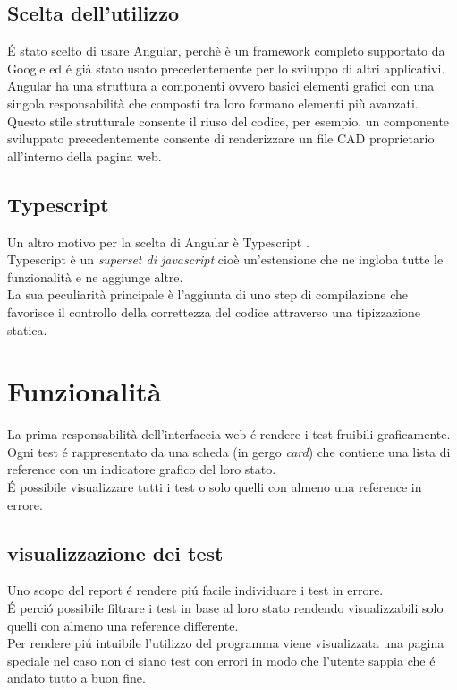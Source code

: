         \subsection{Scelta dell'utilizzo}
            \'E stato scelto di usare Angular, perchè è un framework completo supportato da Google
            ed \'e già stato usato precedentemente per lo sviluppo di altri applicativi.\\
            
            Angular ha una struttura a componenti ovvero basici elementi grafici con una singola responsabilità che composti tra loro formano elementi più avanzati.\\
            Questo stile strutturale consente il riuso del codice, per esempio, un componente sviluppato precedentemente consente
            di renderizzare un file CAD proprietario all'interno della pagina web.
        
        \subsection{Typescript}
            Un altro motivo per la scelta di Angular è Typescript \cite{Typescript}.\\
            Typescript è un \textit{superset di javascript} cioè un'estensione che ne ingloba tutte le funzionalità e ne aggiunge altre.\\
            La sua peculiarità principale è l'aggiunta di uno step di compilazione che favorisce il controllo della correttezza del codice attraverso una tipizzazione statica.
    \section{Funzionalità}
        La prima responsabilità dell'interfaccia web \'e rendere i test fruibili graficamente.\\
        Ogni test \'e rappresentato da una scheda (in gergo \textit{card}) che contiene una lista di reference con un indicatore grafico del loro stato.\\
        \'E possibile visualizzare tutti i test o solo quelli con almeno una reference in errore.\\
        \subsection{visualizzazione dei test}        
            Uno scopo del report \'e rendere pi\'u facile individuare i test in errore.\\
            \'E perci\'o possibile filtrare i test in base al loro stato rendendo visualizzabili solo quelli con almeno una reference differente.\\
            Per rendere pi\'u intuibile l'utilizzo del programma viene visualizzata una pagina speciale nel caso non ci siano test con errori in modo che l'utente sappia che \'e andato tutto a buon fine.

